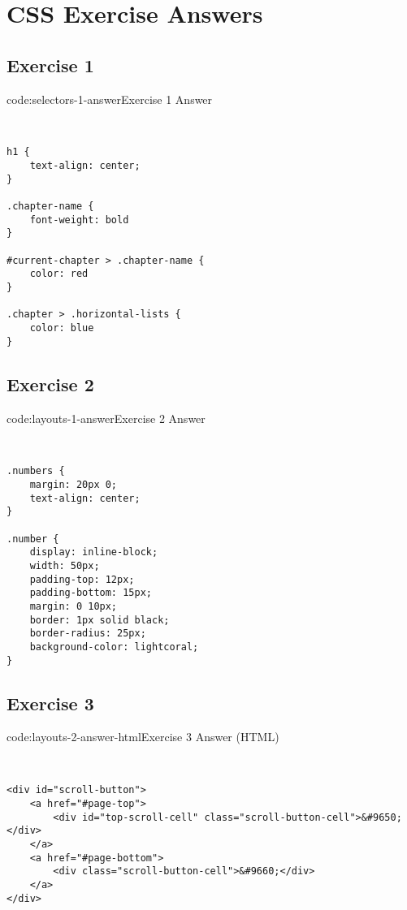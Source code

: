 \section{CSS Exercise Answers}\label{sect:css-exercise-answers}

\subsection*{Exercise 1}

\begin{codeenv}{code:selectors-1-answer}{Exercise 1 Answer}\begin{verbatim}
    

h1 {
    text-align: center;
}

.chapter-name {
    font-weight: bold
}

#current-chapter > .chapter-name {
    color: red
}

.chapter > .horizontal-lists {
    color: blue
}
\end{verbatim}
\end{codeenv}

\subsection*{Exercise 2}

\begin{codeenv}{code:layouts-1-answer}{Exercise 2 Answer}\begin{verbatim}


.numbers {
    margin: 20px 0;
    text-align: center;
}

.number {
    display: inline-block;
    width: 50px;
    padding-top: 12px;
    padding-bottom: 15px;
    margin: 0 10px;
    border: 1px solid black;
    border-radius: 25px;
    background-color: lightcoral;
}
\end{verbatim}
\end{codeenv}

\subsection*{Exercise 3}

\begin{codeenv}{code:layouts-2-answer-html}{Exercise 3 Answer (HTML)}\begin{verbatim}


<div id="scroll-button">
    <a href="#page-top">
        <div id="top-scroll-cell" class="scroll-button-cell">&#9650;</div>
    </a>
    <a href="#page-bottom">
        <div class="scroll-button-cell">&#9660;</div>
    </a>
</div>
\end{verbatim}
\end{codeenv}

